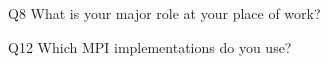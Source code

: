 \begin{description}%
\item{Q8} What is your major role at your place of work?%
\item{Q12} Which MPI implementations do you use?%
\end{description}%

